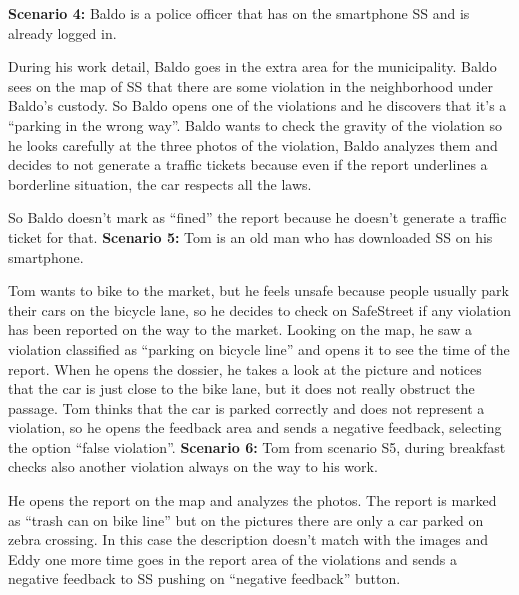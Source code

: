 \documentclass[../RASD.tex]{subfiles}
\begin{document}
    \newline
    \newline
                \textbf{Scenario 4:} Baldo is a police officer that has on the smartphone SS and is already logged in.

                                    During his work detail, Baldo goes in the extra area for the municipality. Baldo sees on the map of SS that there are some violation in the neighborhood under Baldo’s custody. So Baldo opens one of the violations and he discovers that it’s a “parking in the wrong way”. Baldo wants to check the gravity of the violation so he looks carefully at the three photos of the violation, Baldo analyzes them and decides to not generate a traffic tickets because even if the report underlines a borderline situation, the car respects all the laws.

                                     So Baldo doesn’t mark as “fined” the report because he doesn’t generate a traffic ticket for that.
    \newline
    \newline
                \textbf{Scenario 5:} Tom is an old man who has downloaded SS on his smartphone.

                Tom wants to bike to the market, but he feels unsafe because people usually park their cars on the bicycle lane, so he decides to check on SafeStreet if any violation has been reported on the way to the market.  Looking on the map, he saw a violation classified as “parking on bicycle line” and opens it to see the time of the report. When he opens the dossier, he takes a look at the picture and notices that the car is just close to the bike lane, but it does not really obstruct the passage. Tom thinks that the car is parked correctly and does not represent a violation, so he opens the feedback area and sends a negative feedback, selecting the option “false violation”.
                \newline
                \newline
                \textbf{Scenario 6:} Tom from scenario S5, during breakfast checks also another violation always on the way to his work.

                 He opens the report on the map and analyzes the photos. The report is marked as “trash can on bike line” but on the pictures there are only a car parked on zebra crossing. In this case the description doesn’t match with the images and Eddy one more time goes in the report area of the violations and sends a negative feedback to SS pushing on “negative feedback” button.
\end{document}
